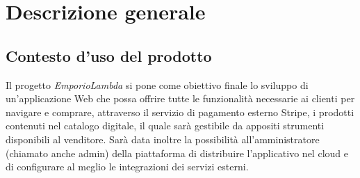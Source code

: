 \section{Descrizione generale}
\subsection{Contesto d'uso del prodotto}
Il progetto \textit{EmporioLambda} si pone come obiettivo finale lo sviluppo di un'applicazione Web che possa offrire tutte le funzionalità necessarie ai clienti per navigare e comprare, attraverso il servizio di pagamento esterno Stripe, i prodotti contenuti nel catalogo digitale, il quale sarà gestibile da appositi strumenti disponibili al venditore. Sarà data inoltre la possibilità all'amministratore (chiamato anche admin) della piattaforma di distribuire l'applicativo nel cloud e di configurare al meglio le integrazioni dei servizi esterni.
